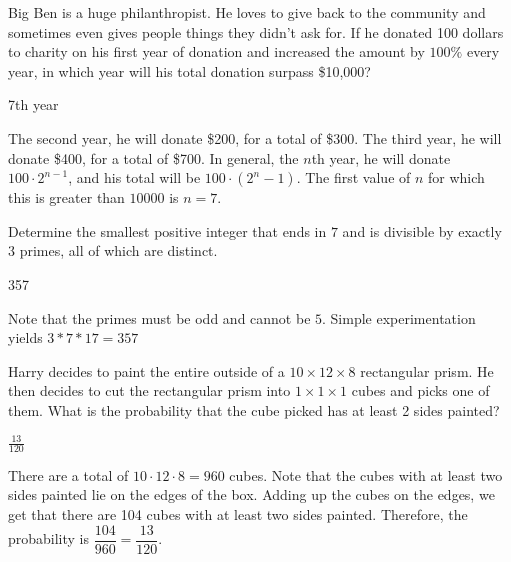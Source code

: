 \documentclass[11pt]{article}
\begin{document}
\begin{problem} 
Big Ben is a huge philanthropist. He loves to give back to the community and sometimes even gives people things they didn't ask for. If he donated 100 dollars to charity on his first year of donation and increased the amount by $100\%$ every year, in which year will his total donation surpass \$10,000? 
\end{problem}

\begin{answer}
7th year
\end{answer}

\begin{solution}
The second year, he will donate \$200, for a total of \$300. The third year, he will donate \$400, for a total of \$700. In general, the $n$th year, he will donate $100 \cdot 2^{n-1}$, and his total will be $100 \cdot (2^{n} - 1)$. The first value of $n$ for which this is greater than $10000$ is $n = 7$.
\end{solution}

\begin{problem}
Determine the smallest positive integer that ends in $7$ and is divisible by exactly 3 primes, all of which are distinct.
\end{problem}

\begin{answer}
357
\end{answer}

\begin{solution}
Note that the primes must be odd and cannot be $5$. Simple experimentation yields $3*7*17 = 357$
\end{solution}


\begin{problem}
Harry decides to paint the entire outside of a $10 \times 12 \times 8$ rectangular prism. He then decides to cut the rectangular prism into $1 \times 1 \times 1$ cubes and picks one of them. What is the probability that the cube picked has at least 2 sides painted? 
\end{problem}

\begin{answer}
$\frac{13}{120}$
\end{answer}

\begin{solution}
There are a total of $10 \cdot 12 \cdot 8 = 960$ cubes. Note that the cubes with at least two sides painted lie on the edges of the box. Adding up the cubes on the edges, we get that there are 104 cubes with at least two sides painted. Therefore, the probability is $\dfrac{104}{960} = \dfrac{13}{120}$.
\end{solution}
\end{document}
